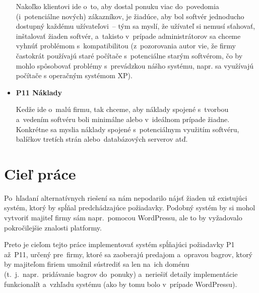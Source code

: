 \begin{itemize}
Nakoľko klientovi ide o~to, aby dostal ponuku viac do~povedomia (i~potenciálne nových) zákazníkov, je žiadúce, aby bol softvér jednoducho dostupný každému užívateľovi~-- tým sa myslí, že užívateľ si nemusí sťahovať, inštalovať žiaden softvér, a~takisto v~prípade administrátorov sa chceme vyhnúť problémom s~kompatibilitou (z~pozorovania autor vie, že firmy častokrát používajú staré počítače s~potenciálne starým softvérom, čo by mohlo spôsobovať problémy s~prevádzkou nášho systému, napr. sa využívajú počítače s operačným systémom XP).

\item \textbf{P11 Náklady}

Kedže ide o~malú firmu, tak chceme, aby náklady spojené s~tvorbou a~vedením softvéru boli minimálne alebo v~ideálnom prípade žiadne. Konkrétne sa myslia náklady spojené s~potenciálnym využitím softvéru, balíčkov tretích strán alebo~databázových serverov atď.
\end{itemize}

\section{Cieľ práce}

Po~hľadaní alternatívnych riešení sa nám nepodarilo nájsť žiaden už existujúci systém, ktorý by spĺňal predchádzajúce požiadavky. Podobný systém by si mohol vytvoriť majiteľ firmy sám napr.~pomocou WordPressu, ale to by vyžadovalo pokročilejšie znalosti platformy.

Preto je cieľom tejto práce implementovať systém spĺňajúci požiadavky P1 až~P11, určený pre~firmy, ktoré sa zaoberajú predajom a~opravou bagrov, ktorý by majiteľom firiem umožnil sústrediť sa len na~ich doménu (t.~j.~napr.~pridávanie bagrov do~ponuky) a~neriešiť detaily implementácie funkcionalít a~vzhľadu systému (ako by tomu bolo v~prípade WordPressu).
